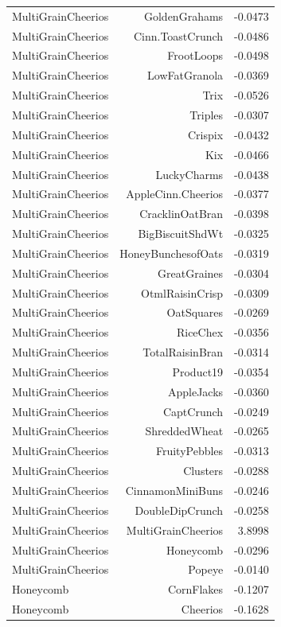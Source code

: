 \begin{longtable}{@{}lrr@{}}
MultiGrainCheerios & GoldenGrahams & -0.0473 \\
MultiGrainCheerios & Cinn.ToastCrunch & -0.0486 \\
MultiGrainCheerios & FrootLoops & -0.0498 \\
MultiGrainCheerios & LowFatGranola & -0.0369 \\
MultiGrainCheerios & Trix & -0.0526 \\
MultiGrainCheerios & Triples & -0.0307 \\
MultiGrainCheerios & Crispix & -0.0432 \\
MultiGrainCheerios & Kix & -0.0466 \\
MultiGrainCheerios & LuckyCharms & -0.0438 \\
MultiGrainCheerios & AppleCinn.Cheerios & -0.0377 \\
MultiGrainCheerios & CracklinOatBran & -0.0398 \\
MultiGrainCheerios & BigBiscuitShdWt & -0.0325 \\
MultiGrainCheerios & HoneyBunchesofOats & -0.0319 \\
MultiGrainCheerios & GreatGraines & -0.0304 \\
MultiGrainCheerios & OtmlRaisinCrisp & -0.0309 \\
MultiGrainCheerios & OatSquares & -0.0269 \\
MultiGrainCheerios & RiceChex & -0.0356 \\
MultiGrainCheerios & TotalRaisinBran & -0.0314 \\
MultiGrainCheerios & Product19 & -0.0354 \\
MultiGrainCheerios & AppleJacks & -0.0360 \\
MultiGrainCheerios & CaptCrunch & -0.0249 \\
MultiGrainCheerios & ShreddedWheat & -0.0265 \\
MultiGrainCheerios & FruityPebbles & -0.0313 \\
MultiGrainCheerios & Clusters & -0.0288 \\
MultiGrainCheerios & CinnamonMiniBuns & -0.0246 \\
MultiGrainCheerios & DoubleDipCrunch & -0.0258 \\
MultiGrainCheerios & MultiGrainCheerios & 3.8998 \\
MultiGrainCheerios & Honeycomb & -0.0296 \\
MultiGrainCheerios & Popeye & -0.0140 \\
Honeycomb & CornFlakes & -0.1207 \\
Honeycomb & Cheerios & -0.1628 \\

\end{longtable}
